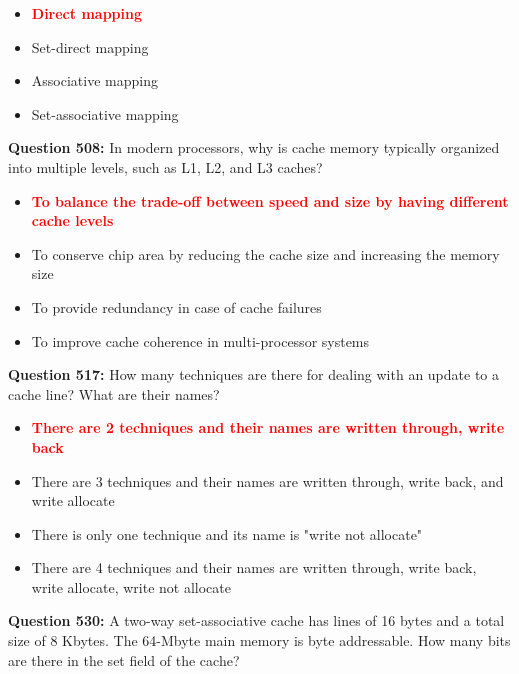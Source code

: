 \documentclass[12pt,a4paper]{article}
\begin{document}
\begin{itemize}
    \item[\textbf{A.}] \textcolor{red}{\textbf{Direct mapping}}
    \item[\textbf{B.}] Set-direct mapping
    \item[\textbf{C.}] Associative mapping
    \item[\textbf{D.}] Set-associative mapping
\end{itemize}

\vspace{0.5cm}

\textbf{Question 508:} In modern processors, why is cache memory typically organized into multiple levels, such as L1, L2, and L3 caches?

\begin{itemize}
    \item[\textbf{A.}] \textcolor{red}{\textbf{To balance the trade-off between speed and size by having different cache levels}}
    \item[\textbf{B.}] To conserve chip area by reducing the cache size and increasing the memory size
    \item[\textbf{C.}] To provide redundancy in case of cache failures
    \item[\textbf{D.}] To improve cache coherence in multi-processor systems
\end{itemize}

\vspace{0.5cm}

\textbf{Question 517:} How many techniques are there for dealing with an update to a cache line? What are their names?

\begin{itemize}
    \item[\textbf{A.}] \textcolor{red}{\textbf{There are 2 techniques and their names are written through, write back}}
    \item[\textbf{B.}] There are 3 techniques and their names are written through, write back, and write allocate
    \item[\textbf{C.}] There is only one technique and its name is "write not allocate"
    \item[\textbf{D.}] There are 4 techniques and their names are written through, write back, write allocate, write not allocate
\end{itemize}

\vspace{0.5cm}

\textbf{Question 530:} A two-way set-associative cache has lines of 16 bytes and a total size of 8 Kbytes. The 64-Mbyte main memory is byte addressable. How many bits are there in the set field of the cache?
\end{document}
